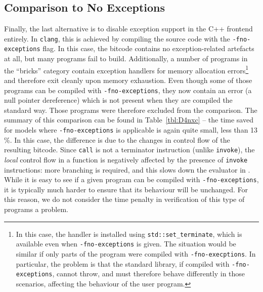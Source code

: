 \subsection{Comparison to No
Exceptions}\label{comparison-to-no-exceptions}

Finally, the last alternative is to disable exception support in the C++
frontend entirely. In \texttt{clang}, this is achieved by compiling the
source code with the \texttt{-fno-exceptions} flag. In this case, the
\llvm{} bitcode contains no exception-related artefacts at all, but many
programs fail to build. Additionally, a number of programs in the
``bricks'' category contain exception handlers for memory allocation
errors\footnote{In this case, the handler is installed using
  \texttt{std::set\_terminate}, which is available even when
  \texttt{-fno-exceptions} is given. The situation would be similar if
  only parts of the program were compiled with \texttt{-fno-execptions}.
  In particular, the problem is that the standard library, if compiled
  with \texttt{-fno-exceptions}, cannot throw, and must therefore behave
  differently in those scenarios, affecting the behaviour of the user
  program.} and therefore exit cleanly upon memory exhaustion. Even
though some of those programs can be compiled with
\texttt{-fno-exceptions}, they now contain an error (a null pointer
dereference) which is not present when they are compiled the standard
way. Those programs were therefore excluded from the comparison. The
summary of this comparison can be found in Table~\ref{tbl:D4nxc} -- the
time saved for models where \texttt{-fno-exceptions} is applicable is
again quite small, less than 13\,\%. In this case, the difference is due
to the changes in control flow of the resulting \llvm{} bitcode. Since
\texttt{call} is not a terminator instruction (unlike \texttt{invoke}),
the \emph{local} control flow in a function is negatively affected by
the presence of \texttt{invoke} instructions: more branching is
required, and this slows down the evaluator in \divm{}. While it is easy to
see if a given program can be compiled with \texttt{-fno-exceptions}, it
is typically much harder to ensure that its behaviour will be unchanged.
For this reason, we do not consider the time penalty in verification of
this type of programs a problem.


